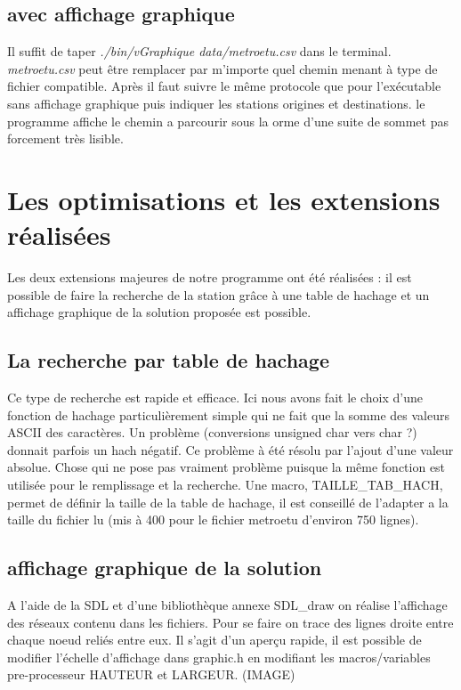 \documentclass[12pt]{report}
\begin{document}
\subsection{avec affichage graphique}
Il suffit de taper \emph{./bin/vGraphique data/metroetu.csv} dans le terminal. \emph{metroetu.csv} peut être remplacer par m'importe quel chemin menant à type de fichier compatible. Après il faut suivre le même protocole que pour l'exécutable sans affichage graphique puis indiquer les stations origines et destinations. le programme affiche le chemin a parcourir sous la orme d'une suite de sommet pas forcement très lisible.


\section{Les optimisations et les extensions réalisées}

Les deux extensions majeures de notre programme ont été réalisées : il est possible de faire la recherche de la station grâce à une table de hachage et un affichage graphique de la solution proposée est possible.

\subsection{La recherche par table de hachage}
Ce type de recherche est rapide et efficace. Ici nous avons fait le choix d'une fonction de hachage particulièrement simple qui ne fait que la somme des valeurs ASCII des caractères. Un problème (conversions unsigned char vers char ?) donnait parfois un hach négatif. Ce problème à été résolu par l'ajout d'une valeur absolue. Chose qui ne pose pas vraiment problème puisque la même fonction est utilisée pour le remplissage et la recherche. Une macro, TAILLE\_TAB\_HACH, permet de définir la taille de la table de hachage, il est conseillé de l'adapter a la taille du fichier lu (mis à 400 pour le fichier metroetu d'environ 750 lignes).

\subsection{affichage graphique de la solution}
A l'aide de la SDL et d'une bibliothèque annexe SDL\_draw on réalise l'affichage des réseaux contenu dans les fichiers. Pour se faire on trace des lignes droite entre chaque noeud reliés entre eux. Il s'agit d'un aperçu rapide, il est possible de modifier l'échelle d'affichage dans graphic.h en modifiant les macros/variables pre-processeur HAUTEUR et LARGEUR. (IMAGE)
\end{document}
